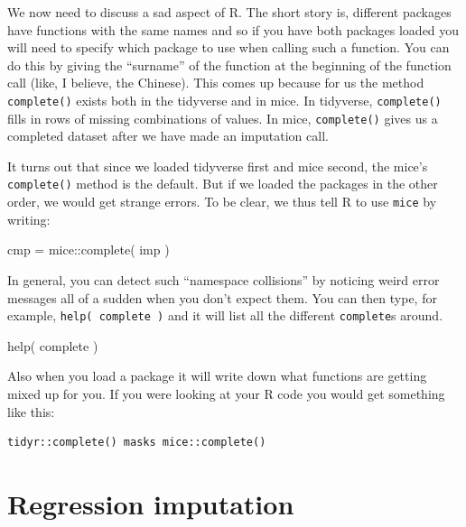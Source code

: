 \documentclass[
  letterpaper,
  DIV=11,
  numbers=noendperiod]{scrreprt}
\newenvironment{Shaded}{}{}
\newcommand{\FunctionTok}[1]{\textcolor[rgb]{0.02,0.16,0.49}{#1}}
\newcommand{\NormalTok}[1]{#1}
\newcommand{\OtherTok}[1]{\textcolor[rgb]{0.00,0.44,0.13}{#1}}
\newcommand{\SpecialCharTok}[1]{\textcolor[rgb]{0.25,0.44,0.63}{#1}}
\begin{document}
We now need to discuss a sad aspect of R. The short story is, different
packages have functions with the same names and so if you have both
packages loaded you will need to specify which package to use when
calling such a function. You can do this by giving the ``surname'' of
the function at the beginning of the function call (like, I believe, the
Chinese). This comes up because for us the method \texttt{complete()}
exists both in the tidyverse and in mice. In tidyverse,
\texttt{complete()} fills in rows of missing combinations of values. In
mice, \texttt{complete()} gives us a completed dataset after we have
made an imputation call.

It turns out that since we loaded tidyverse first and mice second, the
mice's \texttt{complete()} method is the default. But if we loaded the
packages in the other order, we would get strange errors. To be clear,
we thus tell R to use \texttt{mice} by writing:

\begin{Shaded}
\begin{Highlighting}[]
\NormalTok{  cmp }\OtherTok{=}\NormalTok{ mice}\SpecialCharTok{::}\FunctionTok{complete}\NormalTok{( imp )}
\end{Highlighting}
\end{Shaded}

In general, you can detect such ``namespace collisions'' by noticing
weird error messages all of a sudden when you don't expect them. You can
then type, for example, \texttt{help(\ complete\ )} and it will list all
the different \texttt{complete}s around.

\begin{Shaded}
\begin{Highlighting}[]
  \FunctionTok{help}\NormalTok{( complete )}
\end{Highlighting}
\end{Shaded}

Also when you load a package it will write down what functions are
getting mixed up for you. If you were looking at your R code you would
get something like this:

\begin{verbatim}
tidyr::complete() masks mice::complete()
\end{verbatim}

\section{Regression imputation}\label{regression-imputation}
\end{document}
